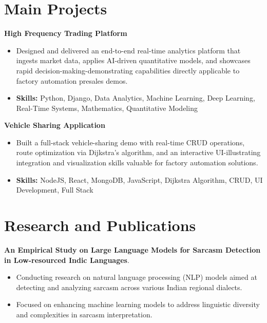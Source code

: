 \documentclass[a4paper,11pt]{article}
\begin{document}
\section{\textbf{Main Projects}}

\vspace{1mm}
  \textbf{High Frequency Trading Platform  }
\vspace{-1.5mm} %
\begin{itemize}
  \item Designed and delivered an end-to-end real-time analytics platform that ingests market data, applies AI-driven quantitative models, and showcases rapid decision-making-demonstrating capabilities directly applicable to factory automation presales demos.
\vspace{-3mm}
  \item \textbf{Skills:} Python, Django, Data Analytics, Machine Learning, Deep Learning, Real-Time Systems, Mathematics, Quantitative Modeling
\end{itemize}


\vspace{1mm}
   \textbf{Vehicle Sharing Application }
\vspace{-1.5mm} %
\begin{itemize}
  \item Built a full-stack vehicle-sharing demo with real-time CRUD operations, route optimization via Dijkstra's algorithm, and an interactive UI-illustrating integration and visualization skills valuable for factory automation solutions.
\vspace{-3mm}
  \item \textbf{Skills:} NodeJS, React, MongoDB, JavaScript, Dijkstra Algorithm, CRUD, UI Development, Full Stack
\end{itemize}



\section{\textbf{Research and Publications} \hfill }
\vspace{1mm}
  \textbf{An Empirical Study on Large Language Models for Sarcasm Detection in Low-resourced Indic Languages}.
\vspace{-1mm} %
\begin{itemize}
  \item Conducting research on natural language processing (NLP) models aimed at detecting and analyzing sarcasm across various Indian regional dialects.
\vspace{-3mm}
  \item Focused on enhancing machine learning models to address linguistic diversity and complexities in sarcasm interpretation.
\end{itemize}
\end{document}
